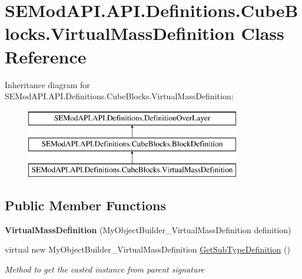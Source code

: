 \hypertarget{class_s_e_mod_a_p_i_1_1_a_p_i_1_1_definitions_1_1_cube_blocks_1_1_virtual_mass_definition}{}\section{S\+E\+Mod\+A\+P\+I.\+A\+P\+I.\+Definitions.\+Cube\+Blocks.\+Virtual\+Mass\+Definition Class Reference}
\label{class_s_e_mod_a_p_i_1_1_a_p_i_1_1_definitions_1_1_cube_blocks_1_1_virtual_mass_definition}
Inheritance diagram for S\+E\+Mod\+A\+P\+I.\+A\+P\+I.\+Definitions.\+Cube\+Blocks.\+Virtual\+Mass\+Definition\+:\begin{figure}[H]
\begin{center}
\leavevmode
\includegraphics[height=3.000000cm]{class_s_e_mod_a_p_i_1_1_a_p_i_1_1_definitions_1_1_cube_blocks_1_1_virtual_mass_definition}
\end{center}
\end{figure}
\subsection*{Public Member Functions}
\begin{DoxyCompactItemize}
\item 
\hypertarget{class_s_e_mod_a_p_i_1_1_a_p_i_1_1_definitions_1_1_cube_blocks_1_1_virtual_mass_definition_a866dd073d1cb156ccb1efd346a61308b}{}{\bfseries Virtual\+Mass\+Definition} (My\+Object\+Builder\+\_\+\+Virtual\+Mass\+Definition definition)\label{class_s_e_mod_a_p_i_1_1_a_p_i_1_1_definitions_1_1_cube_blocks_1_1_virtual_mass_definition_a866dd073d1cb156ccb1efd346a61308b}

\item 
virtual new My\+Object\+Builder\+\_\+\+Virtual\+Mass\+Definition \hyperlink{class_s_e_mod_a_p_i_1_1_a_p_i_1_1_definitions_1_1_cube_blocks_1_1_virtual_mass_definition_a8980177b0e02d51d4bf1d1e10d673554}{Get\+Sub\+Type\+Definition} ()
\begin{DoxyCompactList}\small\item\em Method to get the casted instance from parent signature \end{DoxyCompactList}\end{DoxyCompactItemize}
